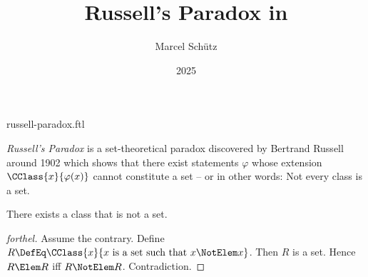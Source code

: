 \documentclass{stex}
\title{Russell's Paradox in \Naproche}
\author{Marcel Schütz}
\date{2025}
\begin{document}
\begin{smodule}{russell-paradox.ftl}



\maketitle

\noindent \emph{Russell's Paradox} is a set-theoretical paradox discovered by
Bertrand Russell around 1902 \cite[chapter XV]{Frege1980} which shows that 
there exist statements $\varphi$ whose extension
$\CClass{x}{\varphi(x)}$ cannot constitute a set -- or in other words:
Not every class is a set.

\begin{forthel}
  \begin{theorem}[title=Russell's Paradox,name=Russell Paradox]
    There exists a class that is not a set.
  \end{theorem}
  \begin{proof}[forthel]
    Assume the contrary.
    Define $R \DefEq \CClass{x}{x \text{ is a set such that } x \NotElem x}$.
    Then $R$ is a set.
    Hence $R \Elem R$ iff $R \NotElem R$.
    Contradiction.
  \end{proof}
\end{forthel}

\printbibliography
{}
\end{smodule}
\end{document}
